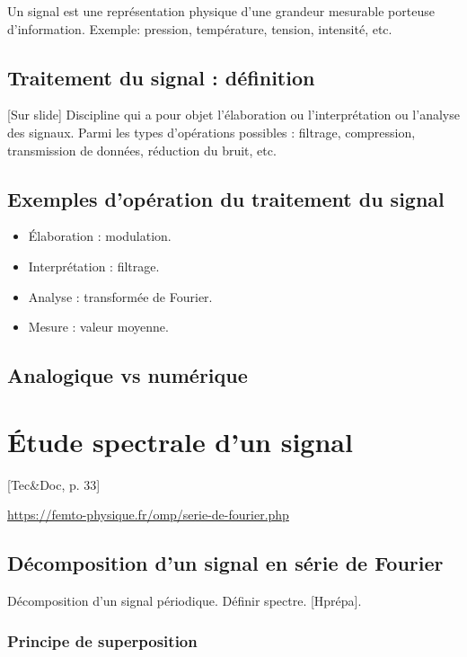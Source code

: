 \documentclass[11pt]{report}
\numberwithin{figure}{section}
\numberwithin{equation}{section}
\numberwithin{table}{section}
\newcommand{\1}{\boldsymbol{1}}
\begin{document}
Un signal est une représentation physique d'une grandeur mesurable porteuse d'information. Exemple: pression, température, tension, intensité, etc.

\subsection*{Traitement du signal : définition}

[Sur slide] Discipline qui a pour objet l'élaboration ou l'interprétation ou l'analyse des signaux.  Parmi les types d'opérations possibles : filtrage, compression, transmission de données, réduction du bruit, etc.

\subsection*{Exemples d'opération du traitement du signal}

\begin{itemize}
\item \'Elaboration : modulation.
\item Interprétation : filtrage.
\item Analyse : transformée de Fourier.
\item Mesure : valeur moyenne.
\end{itemize}


\subsection*{Analogique vs numérique}


\section{Étude spectrale d'un signal}

[Tec\&Doc, p. 33]

\url{https://femto-physique.fr/omp/serie-de-fourier.php}


\subsection{Décomposition d’un signal en série de Fourier}

Décomposition d'un signal périodique. Définir spectre. [Hprépa].


\subsubsection{Principe de superposition}
\end{document}
